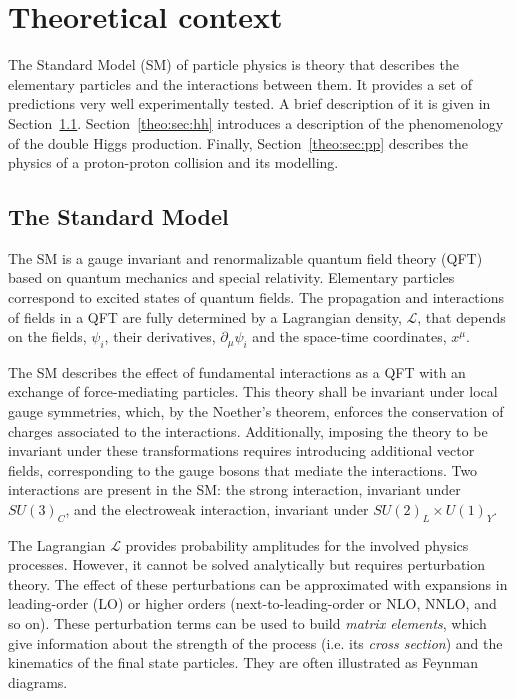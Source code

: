 \documentclass[../main.tex]{subfiles}
\begin{document}
\chapter{Theoretical context}

The Standard Model (SM) of particle physics is theory that describes the elementary particles and the interactions between them. It provides a set of predictions very well experimentally tested. A brief description of it is given in Section~\ref{theo:sec:sm}. Section~\ref{theo:sec:hh} introduces a description of the phenomenology of the double Higgs production. Finally, Section~\ref{theo:sec:pp} describes the physics of a proton-proton collision and its modelling.

\section{The Standard Model}
\label{theo:sec:sm}

The SM is a gauge invariant and renormalizable quantum field theory (QFT) based on quantum mechanics and special relativity. Elementary particles correspond to excited states of quantum fields. The propagation and interactions of fields in a QFT are fully determined by a Lagrangian density, $\mathcal{L}$, that depends on the fields, $\psi_i$, their derivatives, $\partial_\mu \psi_i$ and the space-time coordinates, $x^\mu$. 


The SM describes the effect of fundamental interactions as a QFT with an exchange of force-mediating particles. This theory shall be invariant under local gauge symmetries, which, by the Noether's theorem, enforces the conservation of charges associated to the interactions. Additionally, imposing the theory to be invariant under these transformations requires introducing additional vector fields, corresponding to the gauge bosons that mediate the interactions. Two interactions are present in the SM: the strong interaction, invariant under $SU(3)_C$, and the electroweak interaction, invariant under $SU(2)_L\times U(1)_Y$.


The Lagrangian $\mathcal{L}$ provides probability amplitudes for the involved physics processes. However, it cannot be solved analytically but requires perturbation theory. The effect of these perturbations can be approximated with expansions in leading-order (LO) or higher orders (next-to-leading-order or NLO, NNLO, and so on). These perturbation terms can be used to build \textit{matrix elements}, which give information about the strength of the process (i.e. its \textit{cross section}) and the kinematics of the final state particles. They are often illustrated as Feynman diagrams.
\end{document}
